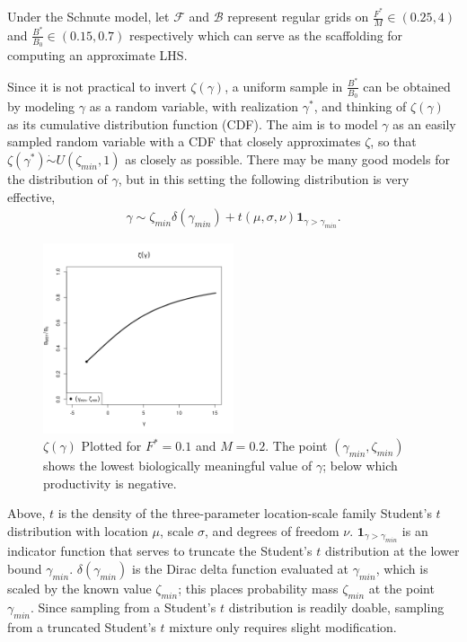 %
Under the Schnute model, let $\mathcal{F}$ and $\mathcal{B}$ represent regular grids on
\mbox{$\frac{F^*}{M}\in(0.25, 4)$} and \mbox{$\frac{B^*}{B_0}\in(0.15, 0.7)$}
respectively which can serve as the scaffolding for computing an approximate LHS.

%
Since it is not practical to invert $\zeta(\gamma)$, a uniform sample in
$\frac{B^*}{B_0}$ can be obtained by modeling $\gamma$ as a random
variable, with realization $\gamma^*$, and thinking of $\zeta(\gamma)$ as its
cumulative distribution function (CDF). The aim is to model $\gamma$ as an
easily sampled random variable with a CDF that closely approximates $\zeta$, so
that $\zeta(\gamma^*)\dot\sim U(\zeta_{min},1)$ as closely as possible. There
may be many good models for the distribution of $\gamma$, but in this setting
the following distribution is very effective,
%
\begin{align}
\gamma \sim \zeta_{min}\delta(\gamma_{min}) + t(\mu, \sigma, \nu)\bm{1}_{\gamma>\gamma_{min}}. \label{mixT}
\end{align}

%

%
\begin{figure}
\vspace*{-1cm}
\includegraphics[width=0.5\textwidth]{../gpBias/zeta.png}
\vspace*{-1.3cm}
\caption{$\zeta(\gamma)$ Plotted for $F^*=0.1$ and $M=0.2$. The point
$(\gamma_{min}, \zeta_{min})$ shows the lowest biologically meaningful
value of $\gamma$; below which productivity is negative.}
\end{figure}

%
Above, $t$ is the density of the three-parameter location-scale family Student's $t$
distribution with location $\mu$, scale $\sigma$, and degrees of freedom $\nu$.
$\bm{1}_{\gamma>\gamma_{min}}$ is an indicator function that serves to truncate the
Student's $t$ distribution at the lower bound $\gamma_{min}$.
$\delta(\gamma_{min})$ is the Dirac delta function evaluated at $\gamma_{min}$,
which is scaled by the known value $\zeta_{min}$; this places probability mass
$\zeta_{min}$ at the point $\gamma_{min}$. Since sampling from a Student's $t$
distribution is readily doable, sampling from a truncated Student's $t$ mixture
only requires slight modification.

